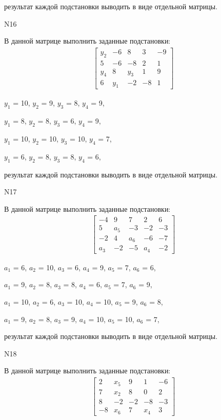 \documentclass[11pt]{report}
\begin{document}
результат каждой подстановки выводить в виде отдельной матрицы.

N16

В данной матрице выполнить заданные подстановки:
\begin{align*}
\left[\begin{matrix}y_{2} & -6 & 8 & 3 & -9\\5 & -6 & -8 & 2 & 1\\y_{4} & 8 & y_{3} & 1 & 9\\6 & y_{1} & -2 & -8 & 1\end{matrix}\right]
\end{align*}


$y_{1}$ = 10, $y_{2}$ = 9, $y_{3}$ = 8, $y_{4}$ = 9, 

$y_{1}$ = 8, $y_{2}$ = 8, $y_{3}$ = 6, $y_{4}$ = 9, 

$y_{1}$ = 10, $y_{2}$ = 10, $y_{3}$ = 10, $y_{4}$ = 7, 

$y_{1}$ = 6, $y_{2}$ = 8, $y_{3}$ = 8, $y_{4}$ = 6, 

результат каждой подстановки выводить в виде отдельной матрицы.

N17

В данной матрице выполнить заданные подстановки:
\begin{align*}
\left[\begin{matrix}-4 & 9 & 7 & 2 & 6\\5 & a_{5} & -3 & -2 & -3\\-2 & 4 & a_{6} & -6 & -7\\a_{3} & -2 & -5 & a_{4} & -2\end{matrix}\right]
\end{align*}


$a_{1}$ = 6, $a_{2}$ = 10, $a_{3}$ = 6, $a_{4}$ = 9, $a_{5}$ = 7, $a_{6}$ = 6, 

$a_{1}$ = 9, $a_{2}$ = 8, $a_{3}$ = 8, $a_{4}$ = 6, $a_{5}$ = 7, $a_{6}$ = 9, 

$a_{1}$ = 10, $a_{2}$ = 6, $a_{3}$ = 10, $a_{4}$ = 10, $a_{5}$ = 9, $a_{6}$ = 8, 

$a_{1}$ = 9, $a_{2}$ = 8, $a_{3}$ = 9, $a_{4}$ = 10, $a_{5}$ = 10, $a_{6}$ = 7, 

результат каждой подстановки выводить в виде отдельной матрицы.

N18

В данной матрице выполнить заданные подстановки:
\begin{align*}
\left[\begin{matrix}2 & x_{5} & 9 & 1 & -6\\7 & x_{2} & 8 & 0 & 2\\8 & -2 & -2 & -8 & -3\\-8 & x_{6} & 7 & x_{4} & 3\end{matrix}\right]
\end{align*}
\end{document}
